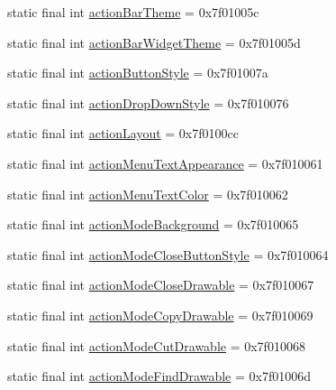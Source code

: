 \begin{CompactItemize}
static final int \hyperlink{classandroid_1_1support_1_1graphics_1_1drawable_1_1_r_1_1attr_d3c00f7cdb20162ac5946262d84a4c4a}{actionBarTheme} = 0x7f01005c
\item 
static final int \hyperlink{classandroid_1_1support_1_1graphics_1_1drawable_1_1_r_1_1attr_1ce84e504387d92e4b262c17ad08e913}{actionBarWidgetTheme} = 0x7f01005d
\item 
static final int \hyperlink{classandroid_1_1support_1_1graphics_1_1drawable_1_1_r_1_1attr_4b251ba9857ee7072e47a5b66a1dda01}{actionButtonStyle} = 0x7f01007a
\item 
static final int \hyperlink{classandroid_1_1support_1_1graphics_1_1drawable_1_1_r_1_1attr_6d798a8534361334a19285532f5ab72d}{actionDropDownStyle} = 0x7f010076
\item 
static final int \hyperlink{classandroid_1_1support_1_1graphics_1_1drawable_1_1_r_1_1attr_d3f7237664ced125d1f72453012d4324}{actionLayout} = 0x7f0100cc
\item 
static final int \hyperlink{classandroid_1_1support_1_1graphics_1_1drawable_1_1_r_1_1attr_6dcaa0df9e355f3ab25df67684511db9}{actionMenuTextAppearance} = 0x7f010061
\item 
static final int \hyperlink{classandroid_1_1support_1_1graphics_1_1drawable_1_1_r_1_1attr_d6d2219fb712254d24f94ab50dc59932}{actionMenuTextColor} = 0x7f010062
\item 
static final int \hyperlink{classandroid_1_1support_1_1graphics_1_1drawable_1_1_r_1_1attr_667e70303062dddc554fcef0ce17caef}{actionModeBackground} = 0x7f010065
\item 
static final int \hyperlink{classandroid_1_1support_1_1graphics_1_1drawable_1_1_r_1_1attr_730564cfa97524acbcc51f6886fa1c5e}{actionModeCloseButtonStyle} = 0x7f010064
\item 
static final int \hyperlink{classandroid_1_1support_1_1graphics_1_1drawable_1_1_r_1_1attr_8ef40e5ea04bfd46ed1ccb33e4d583d8}{actionModeCloseDrawable} = 0x7f010067
\item 
static final int \hyperlink{classandroid_1_1support_1_1graphics_1_1drawable_1_1_r_1_1attr_ddc24b993610bd82edd6fc99f29be673}{actionModeCopyDrawable} = 0x7f010069
\item 
static final int \hyperlink{classandroid_1_1support_1_1graphics_1_1drawable_1_1_r_1_1attr_fc98fcc819d03b43726ceaa73573c145}{actionModeCutDrawable} = 0x7f010068
\item 
static final int \hyperlink{classandroid_1_1support_1_1graphics_1_1drawable_1_1_r_1_1attr_c49c7522ce3bf5df0d6aa2e8052067ac}{actionModeFindDrawable} = 0x7f01006d

\end{CompactItemize}

